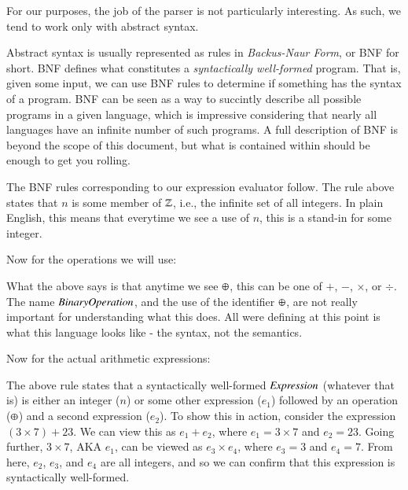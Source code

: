 \documentclass[nocopyrightspace]{sigplanconf}
\begin{document}
For our purposes, the job of the parser is not particularly interesting.
As such, we tend to work only with abstract syntax.

Abstract syntax is usually represented as rules in \emph{Backus-Naur Form}, or BNF for short.
BNF defines what constitutes a \emph{syntactically well-formed} program.
That is, given some input, we can use BNF rules to determine if something has the syntax of a program.
BNF can be seen as a way to succintly describe all possible programs in a given language, which is impressive considering that nearly all languages have an infinite number of such programs.
A full description of BNF is beyond the scope of this document, but what is contained within should be enough to get you rolling.

The BNF rules corresponding to our expression evaluator follow.
The rule above states that $n$ is some member of $\mathbb{Z}$, i.e., the infinite set of all integers.
In plain English, this means that everytime we see a use of $n$, this is a stand-in for some integer.

Now for the operations we will use:
\framed[]{
  \begin{align*}
    \bop \in \BinOp &::= + | - | \times | \div
  \end{align*}
}

What the above says is that anytime we see $\oplus$, this can be one of $+$, $-$, $\times$, or $\div$.
The name $\mathit{BinaryOperation}$, and the use of the identifier $\oplus$, are not really important for understanding what this does.
All were defining at this point is what this language looks like - the syntax, not the semantics.

Now for the actual arithmetic expressions:

The above rule states that a syntactically well-formed $\mathit{Expression}$ (whatever that is) is either an integer ($n$) or some other expression ($e_1$) followed by an operation ($\oplus$) and a second expression ($e_2$).
To show this in action, consider the expression $(3 \times 7) + 23$.
We can view this as $e_1 + e_2$, where $e_1 = 3 \times 7$ and $e_2 = 23$.
Going further, $3 \times 7$, AKA $e_1$, can be viewed as $e_3 \times e_4$, where $e_3 = 3$ and $e_4 = 7$.
From here, $e_2$, $e_3$, and $e_4$ are all integers, and so we can confirm that this expression is syntactically well-formed.
\end{document}
